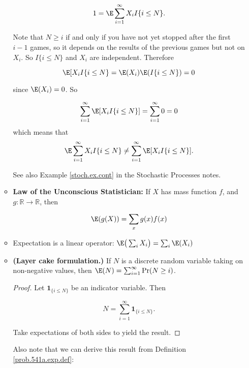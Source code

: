 \begin{itemize}
\begin{itemize}
\begin{example}
\[
1 = \E \sum_{i=1}^\infty X_i I\{i \leq N\}.
\]

Note that \(N \geq i\) if and only if you have not yet stopped after the first \(i-1\) games, so it depends on the results of the previous games but not on \(X_i\). So \(I\{i \leq N\}\) and \(X_i\) are independent. Therefore

\[
  \E [ X_i I\{i \leq N\} = \E(X_i) \E( I\{i \leq N\}) = 0
\]

since \(\E(X_i) = 0\). So

\[
 \sum_{i=1}^\infty  \E [ X_i I\{i \leq N\}] =  \sum_{i=1}^\infty  0 = 0
 \]
which means that 
\[
 \E \sum_{i=1}^\infty X_i I\{i \leq N\} \neq  \sum_{i=1}^\infty  \E [ X_i I\{i \leq N\}].
 \]
 
 See also Example \ref{stoch.ex.cont} in the Stochastic Processes notes.

\end{example}

\item \begin{theorem} \label{prob.law.of.uncon} \textbf{Law of the Unconscious Statistician:} If \(X\) has mass function \(f\), and \(g: \mathbb{R} \to \mathbb{R}\), then 

\[
\E(g(X)) = \sum_x g(x) f(x)
\] \end{theorem}

\item \begin{theorem}Expectation is a linear operator: \( \E \big(\sum_i X_i \big) = \sum_i \E(X_i)\) \end{theorem}

\item \begin{theorem} \textbf{(Layer cake formulation.)} If \(N\) is a discrete random variable taking on non-negative values, then \(\E(N) = \sum_{i=1}^\infty \Pr(N \geq i)\).

\begin{proof} Let \(\boldsymbol{1}_{\{i \leq N\}}\) be an indicator variable. Then 

\[
N = \sum_{i=1}^\infty \boldsymbol{1}_{\{i \leq N\}}.
\]

Take expectations of both sides to yield the result.

\end{proof}

\begin{remark} Also note that we can derive this result from Definition \ref{prob.541a.exp.def}:


\end{remark}
\end{theorem}
\end{itemize}
\end{itemize}
